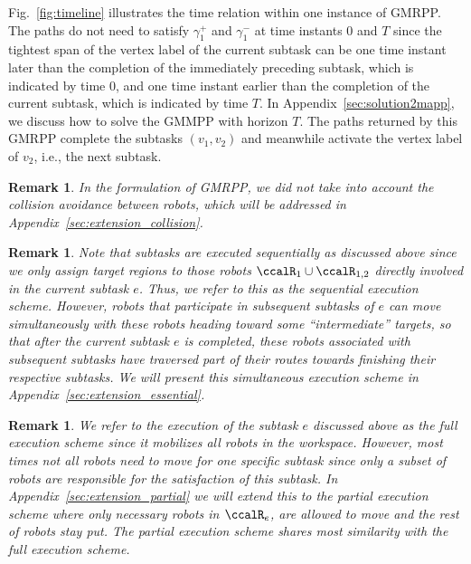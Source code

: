 \documentclass[Afour,sageh,times]{sagej}
\newtheorem{rem}[thm]{Remark}
\begin{document}
{{Fig.~\ref{fig:timeline} illustrates the time relation within one instance of GMRPP.  The paths do not need to satisfy  $\gamma_1^+$ and $\gamma_1^-$ at time instants 0 and  $T$ since the tightest span of the vertex label of the current subtask can be one time instant later than the completion of the immediately preceding subtask, which is indicated by time 0, and one time instant earlier than the completion of the current subtask, which is indicated by time $T$. In Appendix~\ref{sec:solution2mapp}, we discuss how to solve the GMMPP with horizon $T$.  The paths returned by this GMRPP complete the subtasks $(v_1, v_2)$  and meanwhile activate the vertex label of $v_2$, i.e., the next subtask. %

\begin{rem}
  In the formulation of GMRPP, we did not take into account the collision avoidance between robots, which will be addressed in Appendix~\ref{sec:extension_collision}.
\end{rem}

 \begin{rem}
   Note that subtasks are executed sequentially as discussed above since we only assign target regions to those robots $\ccalR_1 \cup \ccalR_{1,2}$ directly involved in the current subtask $e$.  Thus, we refer to this as the sequential execution scheme. However, robots that participate in subsequent subtasks of $e$ can move simultaneously with these robots heading toward some ``intermediate'' targets,  so that after the current subtask $e$ is completed, these robots associated with subsequent subtasks have traversed part of their routes towards finishing their respective subtasks. We will present this simultaneous execution scheme  in Appendix~\ref{sec:extension_essential}.
 \end{rem}

\begin{rem}
  We refer to the execution of the subtask $e$ discussed above as the full execution scheme since it mobilizes all robots in the workspace. However, most times not all robots need to move for one specific subtask since  only a subset of robots are responsible for the satisfaction of this subtask. In Appendix~\ref{sec:extension_partial} we will extend this to  the partial execution scheme where only necessary robots in $\ccalR_e$, are allowed to move and the rest of robots stay put. The partial execution scheme shares  most similarity with the full execution scheme.
\end{rem}




}}
\end{document}
